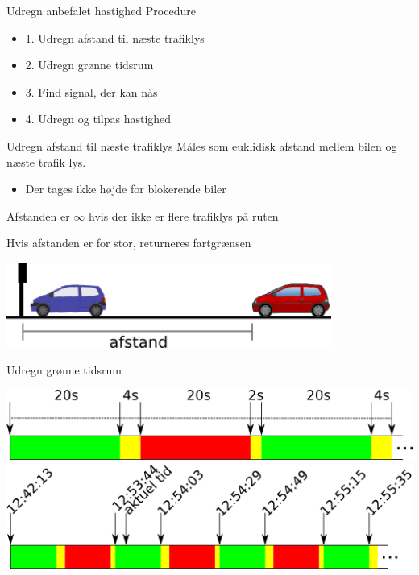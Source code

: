 
\begin{frame}{Udregn anbefalet hastighed}
Procedure
\begin{itemize}
\item 1. Udregn afstand til næste trafiklys
\item 2. Udregn grønne tidsrum
\item 3. Find signal, der kan nås
\item 4. Udregn og tilpas hastighed
\end{itemize}
\end{frame}

\begin{frame}{Udregn afstand til næste trafiklys}
Måles som euklidisk afstand mellem bilen og næste trafik lys.
\begin{itemize}
\item Der tages ikke højde for blokerende biler
\end{itemize}

Afstanden er $\infty$ hvis der ikke er flere trafiklys på ruten

Hvis afstanden er for stor, returneres fartgrænsen

\vspace{5mm}
\begin{center}
\includegraphics[width=0.8\textwidth]{../images/algdistance.png}
\end{center}
\end{frame}

\begin{frame}{Udregn grønne tidsrum}
\begin{center}
\includegraphics[width=1\textwidth]{../images/algphases4.png}
\vspace{5mm}
\includegraphics[width=1\textwidth]{../images/algphases5.png}
\end{center}
\end{frame}

